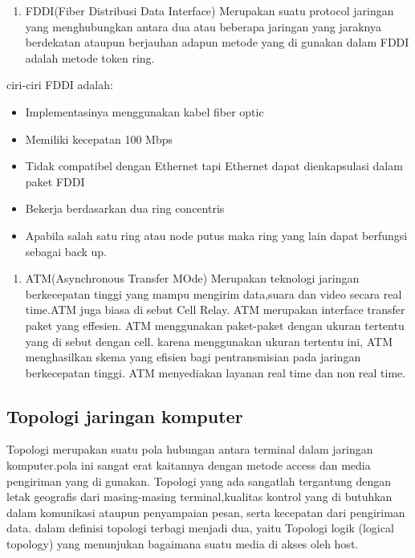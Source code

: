 \begin{enumerate}
  \item FDDI(Fiber Distribusi Data Interface)
        Merupakan suatu protocol jaringan yang menghubungkan antara
        dua atau beberapa jaringan yang jaraknya berdekatan ataupun berjauhan adapun metode yang di gunakan dalam FDDI adalah metode token ring.
\end{enumerate}

ciri-ciri FDDI adalah:
\begin{itemize}
  \item  Implementasinya menggunakan kabel fiber optic
  \item  Memiliki kecepatan 100 Mbps
  \item  Tidak compatibel dengan Ethernet tapi Ethernet dapat
         dienkapsulasi dalam paket FDDI
  \item  Bekerja berdasarkan dua ring concentris
  \item  Apabila salah satu ring atau node putus maka ring yang lain
         dapat berfungsi sebagai back up.
\end{itemize}

\begin{enumerate}
  \item ATM(Asynchronous Transfer MOde)
        Merupakan teknologi jaringan berkecepatan tinggi yang mampu
        mengirim data,suara dan video secara real time.ATM juga biasa di sebut Cell Relay. ATM merupakan interface transfer paket yang effesien. ATM menggunakan paket-paket dengan ukuran tertentu yang di sebut dengan cell. karena menggunakan ukuran tertentu ini, ATM menghasilkan skema yang efisien bagi pentransmisian pada jaringan berkecepatan tinggi. ATM menyediakan layanan real time dan non real time.
\end{enumerate}

\subsection{Topologi jaringan komputer}
Topologi merupakan suatu pola hubungan antara terminal dalam jaringan komputer.pola ini sangat erat kaitannya dengan metode access dan media pengiriman yang di gunakan. Topologi yang ada sangatlah tergantung dengan letak geografis dari masing-masing terminal,kualitas kontrol yang di butuhkan dalam komunikasi ataupun penyampaian pesan, serta kecepatan dari pengiriman data. dalam definisi topologi terbagi menjadi dua, yaitu Topologi logik (logical topology) yang menunjukan bagaimana suatu media di akses oleh host.

